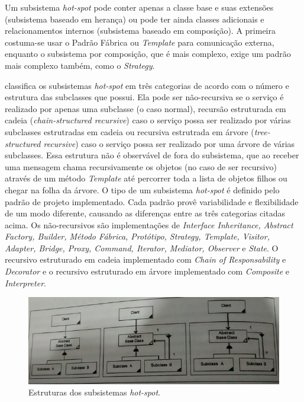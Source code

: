 Um subsistema \textit{hot-spot} pode conter apenas a classe base e suas extensões (subsistema baseado em herança) ou pode ter ainda classes adicionais e relacionamentos internos (subsistema baseado em composição). A primeira costuma-se usar o Padrão Fábrica ou \textit{Template} para comunicação externa, enquanto o subsistema por composição, que é mais complexo, exige um padrão mais complexo também, como o \textit{Strategy}.

\cite{Fayad1999} classifica os subsistemas \textit{hot-spot} em três categorias de acordo com o número e estrutura das subclasses que possui. Ela pode ser não-recursiva se o serviço é realizado por apenas uma subclasse (o caso normal), recursão estruturada em cadeia (\textit{chain-structured recursive}) caso o serviço possa ser realizado por várias subclasses estrutradas em cadeia ou recursiva estrutrada em árvore (\textit{tree-structured recursive}) caso o serviço possa ser realizado por uma árvore de várias subclasses. Essa estrutura não é observável de fora do subsistema, que ao receber uma mensagem chama recursivamente os objetos (no caso de ser recursivo) através de um método \textit{Template} até percorrer toda a lista de objetos filhos ou chegar na folha da árvore. O tipo de um subsistema \textit{hot-spot} é definido pelo padrão de projeto implementado. Cada padrão provê variabilidade e flexibilidade de um modo diferente, causando as diferenças entre as três categorias citadas acima. Os não-recursivos são implementações de \textit{Interface Inheritance, Abstract Factory, Builder, Método Fábrica, Protótipo, Strategy, Template, Visitor, Adapter, Bridge, Proxy, Command, Iterator, Mediator, Observer} e \textit{State}. O recursivo estruturado em cadeia implementado com \textit{Chain of Responsability} e \textit{Decorator} e o recursivo estruturado em árvore implementado com \textit{Composite} e \textit{Interpreter}.

\begin{figure}[h]
	\centering
	\label{fig13}
		\includegraphics[keepaspectratio=true,scale=0.4]{figuras/subsistemaHotspot.jpg}
	\caption{Estruturas dos subsistemas \textit{hot-spot}. \cite{Fayad1999}}
\end{figure}

